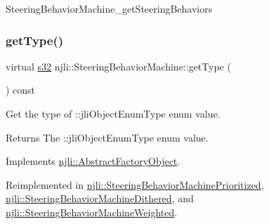 \begin{DoxyCodeInclude}
\end{DoxyCodeInclude}
Steering\+Behavior\+Machine\+\_\+get\+Steering\+Behaviors \mbox{\label{classnjli_1_1_steering_behavior_machine_a9daddfcf84380483cd2643c15d0497a4}} 
\subsubsection{\texorpdfstring{get\+Type()}{getType()}}
{\footnotesize\ttfamily virtual \mbox{\hyperlink{_util_8h_aa62c75d314a0d1f37f79c4b73b2292e2}{s32}} njli\+::\+Steering\+Behavior\+Machine\+::get\+Type (\begin{DoxyParamCaption}{ }\end{DoxyParamCaption}) const\hspace{0.3cm}{\ttfamily [virtual]}}

Get the type of \+::jli\+Object\+Enum\+Type enum value.

\begin{DoxyReturn}{Returns}
The \+::jli\+Object\+Enum\+Type enum value. 
\end{DoxyReturn}


Implements \mbox{\hyperlink{classnjli_1_1_abstract_factory_object_a207c86146d40d0794708ae7f2d4e60a7}{njli\+::\+Abstract\+Factory\+Object}}.



Reimplemented in \mbox{\hyperlink{classnjli_1_1_steering_behavior_machine_prioritized_adbf4f6b3ea233a5ae575d366b977d630}{njli\+::\+Steering\+Behavior\+Machine\+Prioritized}}, \mbox{\hyperlink{classnjli_1_1_steering_behavior_machine_dithered_a5c38478d79cba8bc3069eac4e24acc0a}{njli\+::\+Steering\+Behavior\+Machine\+Dithered}}, and \mbox{\hyperlink{classnjli_1_1_steering_behavior_machine_weighted_a4d9fcf0548dc29c760dad537716c645e}{njli\+::\+Steering\+Behavior\+Machine\+Weighted}}.

\mbox{\label{classnjli_1_1_steering_behavior_machine_a3826fef1020cad7acb80436f7c9a71bd}} 
